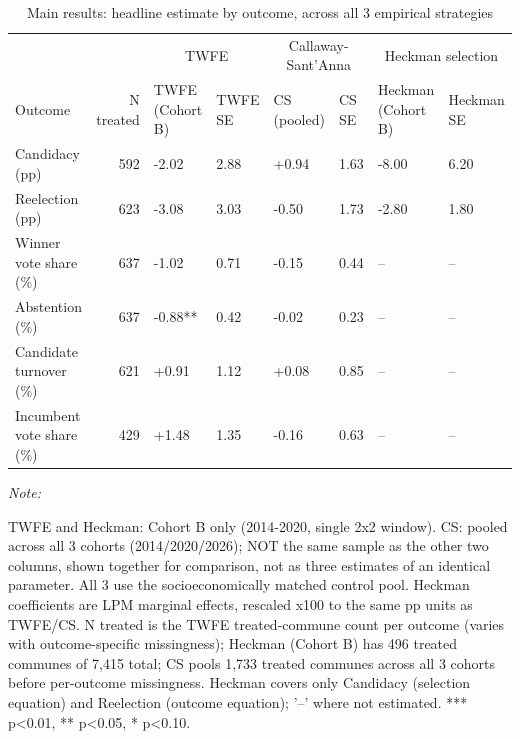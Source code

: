 \begin{table}[!h]
\centering
\caption{\label{tab:main_results}Main results: headline estimate by outcome, across all 3 empirical strategies}
\centering
\fontsize{9}{11}\selectfont
\begin{threeparttable}
\begin{tabular}[t]{lrllllll}
\toprule
\multicolumn{2}{c}{ } & \multicolumn{2}{c}{TWFE} & \multicolumn{2}{c}{Callaway-Sant'Anna} & \multicolumn{2}{c}{Heckman selection} \\
\cmidrule(l{3pt}r{3pt}){3-4} \cmidrule(l{3pt}r{3pt}){5-6} \cmidrule(l{3pt}r{3pt}){7-8}
Outcome & N treated & TWFE (Cohort B) & TWFE SE & CS (pooled) & CS SE & Heckman (Cohort B) & Heckman SE\\
\midrule
Candidacy (pp) & 592 & -2.02 & 2.88 & +0.94 & 1.63 & -8.00 & 6.20\\
Reelection (pp) & 623 & -3.08 & 3.03 & -0.50 & 1.73 & -2.80 & 1.80\\
Winner vote share (\%) & 637 & -1.02 & 0.71 & -0.15 & 0.44 & -- & --\\
Abstention (\%) & 637 & -0.88** & 0.42 & -0.02 & 0.23 & -- & --\\
Candidate turnover (\%) & 621 & +0.91 & 1.12 & +0.08 & 0.85 & -- & --\\
Incumbent vote share (\%) & 429 & +1.48 & 1.35 & -0.16 & 0.63 & -- & --\\
\bottomrule
\end{tabular}
\begin{tablenotes}
\item \textit{Note: } 
\item TWFE and Heckman: Cohort B only (2014-2020, single 2x2 window). CS: pooled across all 3 cohorts (2014/2020/2026); NOT the same sample as the other two columns, shown together for comparison, not as three estimates of an identical parameter. All 3 use the socioeconomically matched control pool. Heckman coefficients are LPM marginal effects, rescaled x100 to the same pp units as TWFE/CS. N treated is the TWFE treated-commune count per outcome (varies with outcome-specific missingness); Heckman (Cohort B) has 496 treated communes of 7,415 total; CS pools 1,733 treated communes across all 3 cohorts before per-outcome missingness. Heckman covers only Candidacy (selection equation) and Reelection (outcome equation); '--' where not estimated. *** p<0.01, ** p<0.05, * p<0.10.
\end{tablenotes}
\end{threeparttable}
\end{table}
